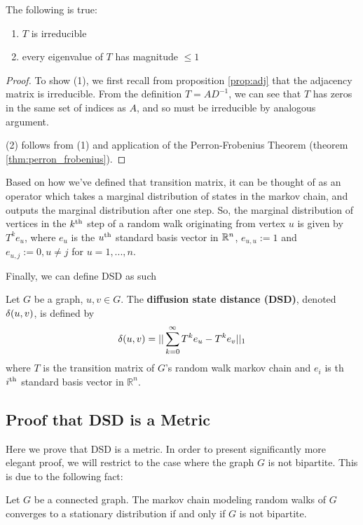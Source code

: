 \begin{proposition}[Properties of $T$]
  The following is true:
  \begin{enumerate}
  \item $T$ is irreducible
  \item every eigenvalue of $T$ has magnitude $\leq 1$
  \end{enumerate}
\end{proposition}

\begin{proof}
  To show (1), we first recall from proposition \ref{prop:adj} that the adjacency matrix is
  irreducible. From the definition $T = AD^{-1}$, we can see that $T$ has zeros in the same set of
  indices as $A$, and so must be irreducible by analogous argument.

  (2) follows from (1) and application of the Perron-Frobenius Theorem (theorem
  \ref{thm:perron_frobenius}).
\end{proof}

Based on how we've defined that transition matrix, it can be thought of as an operator which takes a
marginal distribution of states in the markov chain, and outputs the marginal distribution after one
step. So, the marginal distribution of vertices in the $k^{\mathrm{th}}$ step of a random walk originating
from vertex $u$ is given by $T^ke_u$, where $e_u$ is the $u^{\mathrm{th}}$ standard basis vector in $\mathbb{R}^n$,
$e_{u,u} := 1$ and $e_{u,j} := 0, u \neq j$ for $u=1,...,n$.

Finally, we can define DSD as such

\begin{definition}
  Let $G$ be a graph, $u,v \in G$. The \textbf{diffusion state distance (DSD)}, denoted $\delta(u,v)$,
  is defined by
  \[
    \delta(u,v) = ||\sum_{k =0}^{\infty}{T^ke_u - T^ke_v}||_1
  \]
  where $T$ is the transition matrix of $G$'s random walk markov chain and $e_i$ is th $i^{\mathrm{th}}$
  standard basis vector in $\mathbb{R}^n$.
\end{definition}


\subsection{Proof that DSD is a Metric}

Here we prove that DSD is a metric. In order to present significantly more elegant proof, we will
restrict to the case where the graph $G$ is not bipartite. This is due to the following fact:

\begin{theorem}[Page 310 of ]
  Let $G$ be a connected graph. The markov chain modeling random walks of $G$ converges to a
  stationary distribution if and only if $G$ is not bipartite.
\end{theorem}

